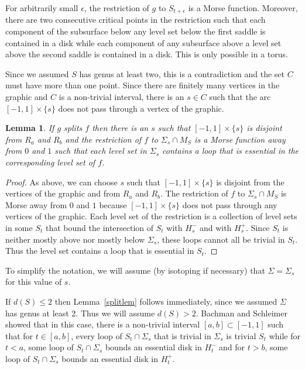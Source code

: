\documentclass[12pt]{amsart}
\theoremstyle{plain}
\newtheorem{Lem}[Thm]{Lemma}
\theoremstyle{definition}
\begin{document}
For arbitrarily small $\epsilon$, the restriction of $g$ to $S_{t+\epsilon}$ is a Morse function.  Moreover, there are two consecutive critical points in the restriction such that each component of the subsurface below any level set below the first saddle is contained in a disk while each component of any subsurface above a level set above the second saddle is contained in a disk.  This is only possible in a torus.  

Since we assumed $S$ has genus at least two, this is a contradiction and the set $C$ must have more than one point.  Since there are finitely many vertices in the graphic and $C$ is a non-trivial interval, there is an $s \in C$ such that the arc $[-1,1] \times \{s\}$ does not pass through a vertex of the graphic.  

\begin{Lem}
\label{nicesmorselem}
If $g$ splits $f$ then there is an $s$ such that $[-1,1] \times \{s\}$ is disjoint from $R_a$ and $R_b$ and the restriction of $f$ to $\Sigma_s \cap M_S$ is a Morse function away from $0$ and $1$ such that each level set in $\Sigma_s$ contains a loop that is essential in the corresponding level set of $f$.
\end{Lem}

\begin{proof}
As above, we can choose $s$ such that $[-1,1] \times \{s\}$ is disjoint from the vertices of the graphic and from $R_a$ and $R_b$.  The restriction of $f$ to $\Sigma_s \cap M_S$ is Morse away from $0$ and $1$ because $[-1,1] \times \{s\}$ does not pass through any vertices of the graphic.  Each level set of the restriction is a collection of level sets in some $S_t$ that bound the intersection of $S_t$ with $H^-_s$ and with $H^+_s$.  Since $S_t$ is neither mostly above nor mostly below $\Sigma_s$, these loops cannot all be trivial in $S_t$.  Thus the level set contains a loop that is essential in $S_t$.
\end{proof}

To simplify the notation, we will assume (by isotoping if necessary) that $\Sigma = \Sigma_s$ for this value of $s$.

If $d(S) \leq 2$ then Lemma~\ref{splitlem} follows immediately, since we assumed $\Sigma$ has genus at least 2.  Thus we will assume $d(S) > 2$.  Bachman and Schleimer~\cite[Claims 6.3 and 6.7]{bsc:bndls} showed that in this case, there is a non-trivial interval $[a,b] \subset [-1,1]$ such that for $t \in [a,b]$, every loop of $S_t \cap \Sigma_s$ that is trivial in $\Sigma_s$ is trivial $S_t$ while for $t < a$, some loop of $S_t \cap \Sigma_s$ bounds an essential disk in $H^-_t$ and for $t > b$, some loop of $S_t \cap \Sigma_s$ bounds an essential disk in $H^+_t$.
\end{document}
